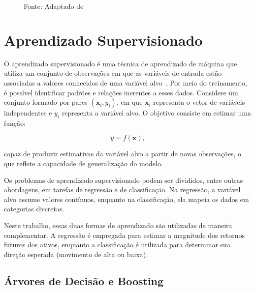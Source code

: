 \begin{figure}[htb]
{%
    }
    Fonte: Adaptado de \cite{walters2014black}
\end{figure}

\section{Aprendizado Supervisionado}
\label{subsec:aprendizado_supervisionado}

O aprendizado supervisionado é uma técnica de aprendizado de máquina que utiliza um conjunto de observações em que as variáveis de entrada estão associadas a valores conhecidos de uma variável alvo~\cite{hastie2009}. Por meio do treinamento, é possível identificar padrões e relações inerentes a esses dados. Considere um conjunto formado por pares $(\mathbf{x}_i,y_i)$, em que $\mathbf{x}_i$ representa o vetor de variáveis independentes e $y_i$ representa a variável alvo. O objetivo consiste em estimar uma função:

\begin{equation}
    \hat{y}=f(\mathbf{x}),
    \label{eq:supervised_learning}
\end{equation}

\noindent capaz de produzir estimativas da variável alvo a partir de novas observações, o que reflete a capacidade de generalização do modelo.

Os problemas de aprendizado supervisionado podem ser divididos, entre outras abordagens, em tarefas de regressão e de classificação. Na regressão, a variável alvo assume valores contínuos, enquanto na classificação, ela mapeia os dados em categorias discretas.

Neste trabalho, essas duas formas de aprendizado são utilizadas de maneira complementar. A regressão é empregada para estimar a magnitude dos retornos futuros dos ativos, enquanto a classificação é utilizada para determinar sua direção esperada (movimento de alta ou baixa).

\subsection{Árvores de Decisão e Boosting}
\label{subsec:arvores_boosting}

